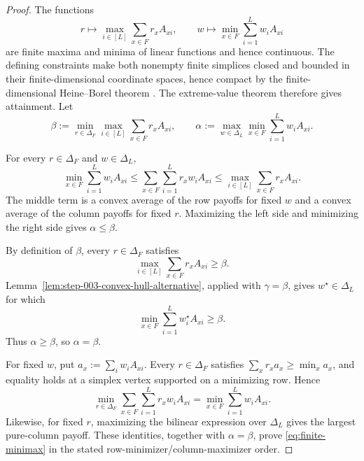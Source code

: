 \begin{proof}
The functions
\[
r\longmapsto\max_{i\in[L]}\sum_{x\in F}r_xA_{xi},
\qquad
w\longmapsto\min_{x\in F}\sum_{i=1}^Lw_iA_{xi}
\]
are finite maxima and minima of linear functions and hence continuous.
The defining constraints make both nonempty finite simplices closed and
bounded in their finite-dimensional coordinate spaces, hence compact by the
finite-dimensional Heine--Borel theorem
\citep[Theorem~2.41]{rudin1976principles}.  The extreme-value theorem
\citep[Theorem~4.16]{rudin1976principles} therefore gives attainment.  Let
\[
\beta:=\min_{r\in\Delta_F}\max_{i\in[L]}
\sum_{x\in F}r_xA_{xi},\qquad
\alpha:=\max_{w\in\Delta_L}\min_{x\in F}
\sum_{i=1}^Lw_iA_{xi}.
\]

For every $r\in\Delta_F$ and $w\in\Delta_L$,
\begin{equation}\label{eq:minimax-weak-duality}
\min_{x\in F}\sum_{i=1}^Lw_iA_{xi}
\le\sum_{x\in F}\sum_{i=1}^Lr_xw_iA_{xi}
\le\max_{i\in[L]}\sum_{x\in F}r_xA_{xi}.
\end{equation}
The middle term is a convex average of the row payoffs for fixed $w$ and a
convex average of the column payoffs for fixed $r$.  Maximizing the left side
and minimizing the right side gives $\alpha\le\beta$.

By definition of $\beta$, every $r\in\Delta_F$ satisfies
\[
\max_{i\in[L]}\sum_{x\in F}r_xA_{xi}\ge\beta.
\]
Lemma~\ref{lem:step-003-convex-hull-alternative}, applied with
$\gamma=\beta$, gives $w^\star\in\Delta_L$ for which
\[
\min_{x\in F}\sum_{i=1}^Lw_i^\star A_{xi}\ge\beta.
\]
Thus $\alpha\ge\beta$, so $\alpha=\beta$.

For fixed $w$, put $a_x:=\sum_iw_iA_{xi}$.  Every
$r\in\Delta_F$ satisfies $\sum_xr_xa_x\ge\min_xa_x$, and equality holds at
a simplex vertex supported on a minimizing row.  Hence
\[
\min_{r\in\Delta_F}\sum_{x\in F}\sum_{i=1}^Lr_xw_iA_{xi}
=\min_{x\in F}\sum_{i=1}^Lw_iA_{xi}.
\]
Likewise, for fixed $r$, maximizing the bilinear expression over
$\Delta_L$ gives the largest pure-column payoff.  These identities, together
with $\alpha=\beta$, prove \eqref{eq:finite-minimax} in the stated
row-minimizer/column-maximizer order.
\end{proof}

